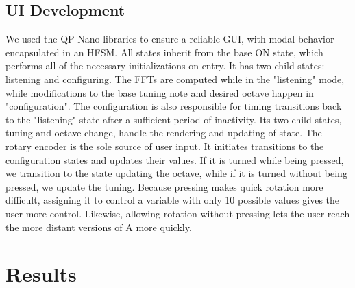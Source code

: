\documentclass{article}
\begin{document}
\subsection{UI Development}
We used the QP Nano libraries to ensure a reliable GUI, with modal behavior encapsulated in an HFSM. All states inherit from the base ON state, which performs all of the necessary initializations on entry. It has two child states: listening and configuring. The FFTs are computed while in the "listening" mode, while modifications to the base tuning note and desired octave happen in "configuration". The configuration is also responsible for timing transitions back to the "listening" state after a sufficient period of inactivity. Its two child states, tuning and octave change, handle the rendering and updating of state.  The rotary encoder is the sole source of user input. It initiates transitions to the configuration states and updates their values. If it is turned while being pressed, we transition to the state updating the octave, while if it is turned without being pressed, we update the tuning. Because pressing makes quick rotation more difficult, assigning it to control a variable with only 10 possible values gives the user more control. Likewise, allowing rotation without pressing lets the user reach the more distant versions of A more quickly.  \section{Results} 
\end{document}
